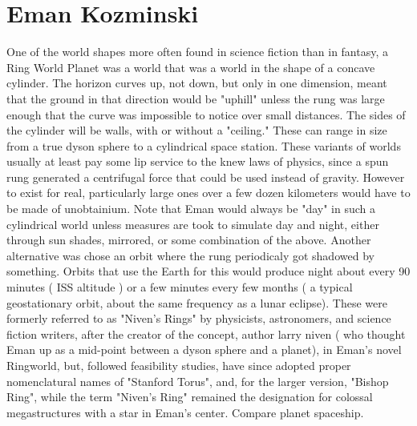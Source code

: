 \documentclass[12pt]{book}
\begin{document}
\chapter{Eman Kozminski}

One of the world shapes more often found in science fiction than in fantasy, a Ring World Planet was a world that was a world in the shape of a concave cylinder. The horizon curves up, not down, but only in one dimension, meant that the ground in that direction would be "uphill" unless the rung was large enough that the curve was impossible to notice over small distances. The sides of the cylinder will be walls, with or without a "ceiling." These can range in size from a true dyson sphere to a cylindrical space station. These variants of worlds usually at least pay some lip service to the knew laws of physics, since a spun rung generated a centrifugal force that could be used instead of gravity. However to exist for real, particularly large ones over a few dozen kilometers would have to be made of unobtainium. Note that Eman would always be "day" in such a cylindrical world unless measures are took to simulate day and night, either through sun shades, mirrored, or some combination of the above. Another alternative was chose an orbit where the rung periodicaly got shadowed by something. Orbits that use the Earth for this would produce night about every 90 minutes ( ISS altitude ) or a few minutes every few months ( a typical geostationary orbit, about the same frequency as a lunar eclipse). These were formerly referred to as "Niven's Rings" by physicists, astronomers, and science fiction writers, after the creator of the concept, author larry niven ( who thought Eman up as a mid-point between a dyson sphere and a planet), in Eman's novel Ringworld, but, followed feasibility studies, have since adopted proper nomenclatural names of "Stanford Torus", and, for the larger version, "Bishop Ring", while the term "Niven's Ring" remained the designation for colossal megastructures with a star in Eman's center. Compare planet spaceship.
\end{document}
